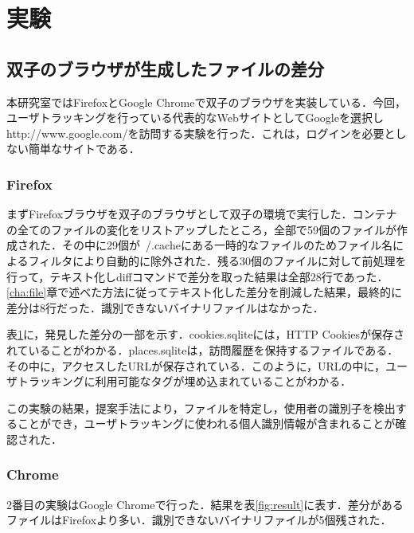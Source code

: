 \documentclass[submit,techrep]{ipsj}
\begin{document}
\begin{itemize}
\begin{table}[ht]
\begin{tabular}{ |p{3.5cm}|p{5cm}|p{5cm}| }
\end{tabular}
\label{fig:data}
\end{table}






\section{実験}
\subsection{双子のブラウザが生成したファイルの差分}
\label{sec:file}

本研究室ではFirefoxとGoogle Chromeで双子のブラウザを実装している．今回，ユーザトラッキングを行っている代表的なWebサイトとしてGoogleを選択しhttp://www.google.com/を訪問する実験を行った．これは，ログインを必要としない簡単なサイトである．

\subsubsection{Firefox}
まずFirefoxブラウザを双子のブラウザとして双子の環境で実行した．コンテナの全てのファイルの変化をリストアップしたところ，全部で59個のファイルが作成された．その中に29個が~/.cacheにある一時的なファイルのためファイル名によるフィルタにより自動的に除外された．残る30個のファイルに対して前処理を行って，テキスト化しdiffコマンドで差分を取った結果は全部28行であった．\ref{cha:file}章で述べた方法に従ってテキスト化した差分を削減した結果，最終的に差分は8行だった．識別できないバイナリファイルはなかった．

表\ref{fig:data}に，発見した差分の一部を示す．cookies.sqliteには，HTTP Cookiesが保存されていることがわかる．places.sqliteは，訪問履歴を保持するファイルである．その中に，アクセスしたURLが保存されている．このように，URLの中に，ユーザトラッキングに利用可能なタグが埋め込まれていることがわかる．

この実験の結果，提案手法により，ファイルを特定し，使用者の識別子を検出することができ，ユーザトラッキングに使われる個人識別情報が含まれることが確認された．

\subsubsection{Chrome}

2番目の実験はGoogle Chromeで行った．結果を表\ref{fig:result}に表す．差分があるファイルはFirefoxより多い．識別できないバイナリファイルが5個残された．


\end{itemize}
\end{document}
